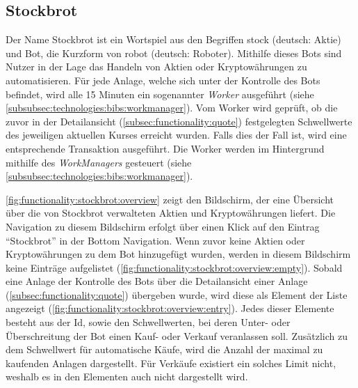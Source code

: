\documentclass[a4paper]{article}
\begin{document}
\subsection{Stockbrot}
\label{subsec:functionality:stockbrot}
Der Name Stockbrot ist ein Wortspiel aus den Begriffen stock (deutsch: Aktie) und Bot, die Kurzform von robot (deutsch: Roboter). Mithilfe dieses Bots sind Nutzer in der Lage das Handeln von Aktien oder Kryptowährungen zu automatisieren. Für jede Anlage, welche sich unter der Kontrolle des Bots befindet, wird alle 15 Minuten ein sogenannter \textit{Worker} ausgeführt (siehe \autoref{subsubsec:technologies:bibs:workmanager}). Vom Worker wird geprüft, ob die zuvor in der Detailansicht (\autoref{subsec:functionality:quote}) festgelegten Schwellwerte des jeweiligen aktuellen Kurses erreicht wurden. Falls dies der Fall ist, wird eine entsprechende Transaktion ausgeführt. Die Worker werden im Hintergrund mithilfe des \textit{WorkManagers} gesteuert (siehe \autoref{subsubsec:technologies:bibs:workmanager}).

\autoref{fig:functionality:stockbrot:overview} zeigt den Bildschirm, der eine Übersicht über die von Stockbrot verwalteten Aktien und Kryptowährungen liefert. Die Navigation zu diesem Bildschirm erfolgt über einen Klick auf den Eintrag "`Stockbrot"' in der Bottom Navigation. Wenn zuvor keine Aktien oder Kryptowährungen zu dem Bot hinzugefügt wurden, werden in diesem Bildschirm keine Einträge aufgelistet (\autoref{fig:functionality:stockbrot:overview:empty}). Sobald eine Anlage der Kontrolle des Bots über die Detailansicht einer Anlage (\autoref{subsec:functionality:quote}) übergeben wurde, wird diese als Element der Liste angezeigt (\autoref{fig:functionality:stockbrot:overview:entry}). Jedes dieser Elemente besteht aus der Id, sowie den Schwellwerten, bei deren Unter- oder Überschreitung der Bot einen Kauf- oder Verkauf veranlassen soll. Zusätzlich zu dem Schwellwert für automatische Käufe, wird die Anzahl der maximal zu kaufenden Anlagen dargestellt. Für Verkäufe existiert ein solches Limit nicht, weshalb es in den Elementen auch nicht dargestellt wird.
\end{document}
